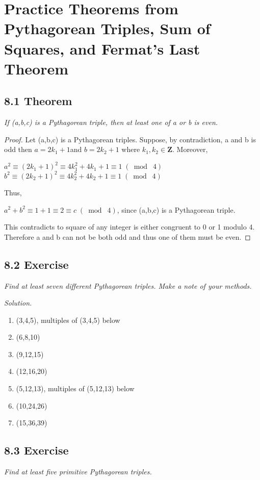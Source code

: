 \documentclass{article}
\begin{document}
\section*{Practice Theorems from Pythagorean Triples, Sum of Squares, and Fermat's Last Theorem}

\subsection*{8.1 Theorem} 
\quad \textit{If (a,b,c) is a Pythagorean triple, then at least one of a or b is even.}

\begin{proof}
Let (a,b,c) is a Pythagorean triples. Suppose, by contradiction, a and b is odd then $a = 2k_1 + 1$and $b= 2k_2 + 1$ where $k_1,k_2 \in \mathbf{Z}$. Moreover, 
\begin{center}
    $a^2 \equiv (2k_1 + 1)^2 \equiv 4k_1^2 + 4k_1+1 \equiv 1 \;(\bmod\; 4)$
    $b^2 \equiv (2k_2 + 1)^2 \equiv 4k_2^2 + 4k_2+1 \equiv 1 \;(\bmod\; 4)$
\end{center}
Thus,
\begin{center}
    $a^2 + b^2 \equiv 1+1 \equiv 2 \equiv c \;(\bmod\; 4)$, since (a,b,c) is a Pythagorean triple.
\end{center}
This contradicts to square of any integer is either congruent to 0 or 1 modulo 4. Therefore a and b can not be both odd and thus one of them must be even.
\end{proof}

\subsection*{8.2 Exercise} 
\quad \textit{Find at least seven different Pythagorean triples. Make a note of your methods.}

\textit{Solution.}
\begin{enumerate}
    \item (3,4,5), multiples of (3,4,5) below
    \item (6,8,10)
    \item (9,12,15)
    \item (12,16,20)
    \item (5,12,13), multiples of (5,12,13) below
    \item (10,24,26)
    \item (15,36,39)
\end{enumerate}

\subsection*{8.3 Exercise} 
\quad \textit{Find at least five primitive Pythagorean triples.}
\end{document}
